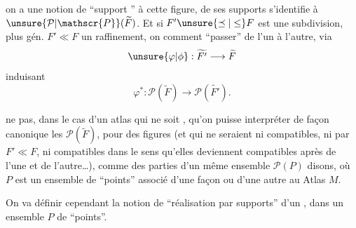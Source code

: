 
on a une notion de ``support ''  à cette figure,   de ses supports s'identifie à $\unsure{\mathcal{P}|\mathscr{P}}(\widetilde F)$. Et si $F'\unsure{\preceq|\leq}F$ est une subdivision, plus gén. $F'\ll F$ un raffinement, on  comment ``passer'' de l'un à l'autre, via
\[
\unsure{\varphi|\phi}:\widetilde{F'}\longrightarrow\widetilde F
\]
induisant
\[
\varphi^*:\mathcal{P}(\widetilde F)\longrightarrow\mathcal{P}(\widetilde{F'}).
\]

 ne  pas, dans le cas d'un atlas qui ne soit , qu'on puisse interpréter  de façon canonique les $\mathcal{P}(\widetilde F)$, pour des figures  (et qui ne seraient ni compatibles, ni  par $F'\ll F$, ni compatibles dans le sens qu'elles deviennent compatibles après  de l'une et de l'autre\ldots), comme des parties d'un même ensemble $\mathcal{P}(P)$ disons, où $P$ est un ensemble de ``points'' associé d'une façon ou d'une autre au  Atlas $M$.

On va définir cependant la notion de ``réalisation par supports'' d'un , dans un ensemble $P$ de ``points''.
